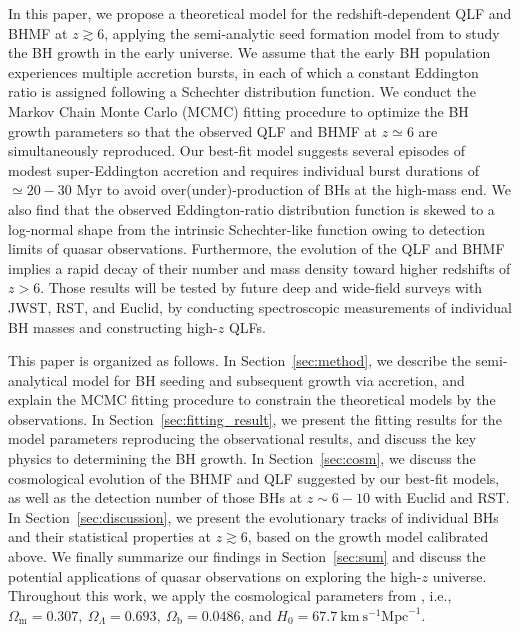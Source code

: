 \documentclass[twocolumn, twocolappendix]{aastex63}
\begin{document}
\begin{CJK*}{UTF8}{gbsn}
In this paper, we propose a theoretical model for the redshift-dependent QLF and BHMF at $z\gtrsim 6$,
applying the semi-analytic seed formation model from \cite{2021ApJ...917...60L} to study the BH growth in the early universe.
We assume that the early BH population experiences multiple accretion bursts, in each of which a constant Eddington ratio is assigned 
following a Schechter distribution function. 
We conduct the Markov Chain Monte Carlo (MCMC) fitting procedure to optimize the BH growth parameters 
so that the observed QLF and BHMF at $z\simeq 6$ are simultaneously reproduced. 
Our best-fit model suggests several episodes of modest super-Eddington accretion and requires
individual burst durations of $\simeq 20-30$ Myr to avoid over(under)-production of BHs at the high-mass end.
We also find that the observed Eddington-ratio distribution function is skewed to a log-normal shape from the intrinsic Schechter-like function
owing to detection limits of quasar observations.
Furthermore, the evolution of the QLF and BHMF implies a rapid decay of 
their number and mass density toward higher redshifts of $z>6$.
Those results will be tested by future deep and wide-field surveys with JWST, RST, and Euclid,
by conducting spectroscopic measurements of individual BH masses and constructing high-$z$ QLFs.  



This paper is organized as follows. 
In Section~\ref{sec:method}, we describe the semi-analytical model for BH seeding and subsequent growth via accretion,
and explain the MCMC fitting procedure to constrain the theoretical models by the observations.
In Section~\ref{sec:fitting_result}, we present the fitting results for the model parameters reproducing the observational results,
and discuss the key physics to determining the BH growth.
In Section~\ref{sec:cosm}, we discuss the cosmological evolution of the BHMF and QLF suggested by our best-fit models, 
as well as the detection number of those BHs at $z\sim 6-10$ with Euclid and RST.
In Section~\ref{sec:discussion}, we present the evolutionary tracks of individual BHs and their statistical properties at $z\gtrsim 6$,
based on the growth model calibrated above.
We finally summarize our findings in Section~\ref{sec:sum} and discuss the potential applications of quasar observations on 
exploring the high-$z$ universe.
Throughout this work, we apply the cosmological parameters from \cite{2016A&A...594A..13P},
i.e., $\Omega_{\mathrm{m}}=0.307,~\Omega_{\Lambda}=0.693,~
\Omega_{\mathrm{b}}=0.0486$, and $H_0=67.7 \mathrm{~km} \mathrm{~s}^{-1} \mathrm{Mpc}^{-1}$.





\end{CJK*}
\end{document}
